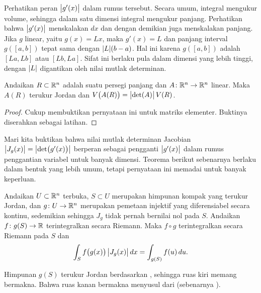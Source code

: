 Perhatikan peran $\bigl\lvert {g'(x)} \bigr\rvert$ dalam rumus tersebut.  Secara umum, integral
mengukur volume, sehingga dalam satu dimensi integral mengukur panjang.
Perhatikan bahwa $\bigl\lvert {g'(x)} \bigr\rvert$ menskalakan $dx$ dan dengan demikian juga
menskalakan panjang.  Jika $g$ linear, yaitu $g(x)=Lx$, maka $g'(x) = L$ dan
panjang interval $g([a,b])$ tepat sama dengan $\lvert {L} \rvert(b-a)$.  Hal ini karena
$g([a,b])$ adalah $[La,Lb]$ atau $[Lb,La]$.  Sifat ini berlaku pula dalam
dimensi yang lebih tinggi, dengan $\lvert {L} \rvert$ digantikan oleh nilai mutlak
determinan.

\begin{prop} \label{prop:volrectdet}
Andaikan $R \subset {\mathbb{R}}^n$ adalah suatu persegi panjang
dan $A \colon {\mathbb{R}}^n \to {\mathbb{R}}^n$ linear.  Maka
$A(R)$ terukur Jordan dan $V\bigl(A(R)\bigr) = \bigl\lvert {\det (A)} \bigr\rvert \, V(R)$.
\end{prop}

\begin{proof}
Cukup membuktikan pernyataan ini untuk matriks elementer.  Buktinya diserahkan
sebagai latihan.
\end{proof}

Mari kita buktikan bahwa
nilai mutlak determinan Jacobian
$\bigl\lvert {J_g(x)} \bigr\rvert = \bigl\lvert {\det \bigl(g'(x)\bigr)} \bigr\rvert$
berperan sebagai pengganti $\bigl\lvert {g'(x)} \bigr\rvert$ dalam rumus penggantian variabel
untuk banyak dimensi.
Teorema berikut sebenarnya berlaku dalam bentuk yang lebih umum,
tetapi pernyataan ini memadai untuk banyak keperluan.

\begin{thm}
Andaikan $U \subset {\mathbb{R}}^n$ terbuka,
$S \subset U$ merupakan himpunan kompak yang terukur Jordan, dan
$g \colon U \to {\mathbb{R}}^n$ merupakan pemetaan injektif
yang diferensiabel secara kontinu, sedemikian sehingga
$J_g$ tidak pernah bernilai nol pada $S$.
Andaikan $f \colon g(S) \to {\mathbb{R}}$ terintegralkan secara Riemann.
Maka $f \circ g$ terintegralkan secara Riemann pada $S$ dan
\begin{equation*}
\int_S f\bigl(g(x)\bigr) \, \bigl\lvert {J_g(x)} \bigr\rvert \, dx
=
\int_{g(S)} f(u) \, du . 
\end{equation*}
\end{thm}

Himpunan $g(S)$ terukur Jordan berdasarkan ,
sehingga ruas kiri memang bermakna.
Bahwa ruas kanan bermakna menyusul dari
 (sebenarnya
).

